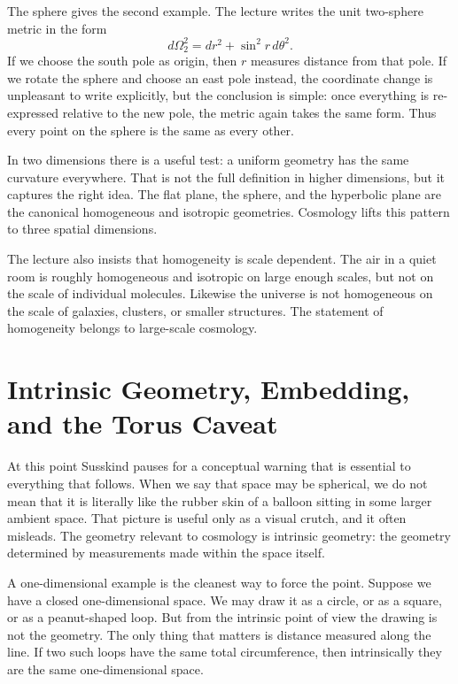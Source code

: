 The sphere gives the second example. The lecture writes the unit two-sphere metric in the form
\begin{equation}
d\Omega_2^2 = dr^2 + \sin^2 r\, d\theta^2 .
\end{equation}
If we choose the south pole as origin, then \(r\) measures distance from that pole. If we rotate the sphere and choose an east pole instead, the coordinate change is unpleasant to write explicitly, but the conclusion is simple: once everything is re-expressed relative to the new pole, the metric again takes the same form. Thus every point on the sphere is the same as every other.

In two dimensions there is a useful test: a uniform geometry has the same curvature everywhere. That is not the full definition in higher dimensions, but it captures the right idea. The flat plane, the sphere, and the hyperbolic plane are the canonical homogeneous and isotropic geometries. Cosmology lifts this pattern to three spatial dimensions.

The lecture also insists that homogeneity is scale dependent. The air in a quiet room is roughly homogeneous and isotropic on large enough scales, but not on the scale of individual molecules. Likewise the universe is not homogeneous on the scale of galaxies, clusters, or smaller structures. The statement of homogeneity belongs to large-scale cosmology.

\section{Intrinsic Geometry, Embedding, and the Torus Caveat}

At this point Susskind pauses for a conceptual warning that is essential to everything that follows. When we say that space may be spherical, we do not mean that it is literally like the rubber skin of a balloon sitting in some larger ambient space. That picture is useful only as a visual crutch, and it often misleads. The geometry relevant to cosmology is intrinsic geometry: the geometry determined by measurements made within the space itself.

A one-dimensional example is the cleanest way to force the point. Suppose we have a closed one-dimensional space. We may draw it as a circle, or as a square, or as a peanut-shaped loop. But from the intrinsic point of view the drawing is not the geometry. The only thing that matters is distance measured along the line. If two such loops have the same total circumference, then intrinsically they are the same one-dimensional space.

